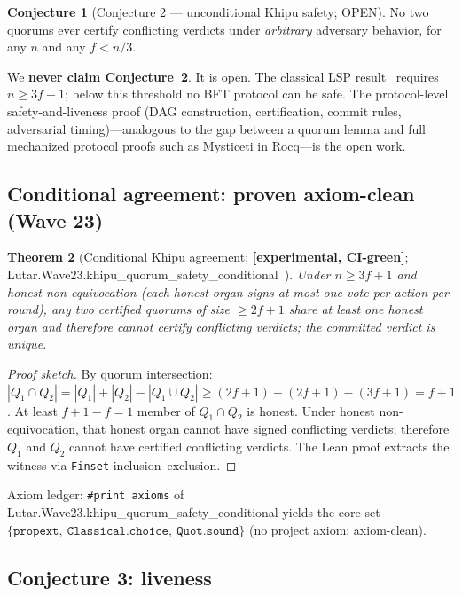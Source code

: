 \documentclass[11pt,letterpaper]{article}
\newcommand{\lean}[1]{{\small\ttfamily #1}}
\newcommand{\lb}{\discretionary{}{}{}}
\newtheorem{theorem}{Theorem}[section]
\theoremstyle{definition}
\newtheorem{conjecture}[theorem]{Conjecture}
\newcommand{\Ucoreaxioms}%
  {\{\texttt{propext},\allowbreak\ \texttt{Classical.choice},\allowbreak\ \texttt{Quot.sound}\}}
\newcommand{\experimental}{\textbf{[experimental, CI-green]}}
\begin{document}
\begin{conjecture}[Conjecture 2 --- unconditional Khipu safety; OPEN]
\label{conj:khipu}
No two quorums ever certify conflicting verdicts under \emph{arbitrary} adversary
behavior, for any $n$ and any $f < n/3$.
\end{conjecture}

\noindent We \textbf{never claim Conjecture~2}.  It is open.  The classical LSP
result~\cite{lamport1982} requires $n \ge 3f+1$; below this threshold no BFT
protocol can be safe.  The protocol-level safety-and-liveness proof (DAG
construction, certification, commit rules, adversarial timing)---analogous to the
gap between a quorum lemma and full mechanized protocol proofs such as Mysticeti
in Rocq---is the open work.

\subsection{Conditional agreement: proven axiom-clean (Wave 23)}

\begin{theorem}[Conditional Khipu agreement; \experimental{};
  \lean{Lutar.\lb Wave23.\lb khipu\_\lb quorum\_\lb safety\_\lb conditional}~\cite{szl_concept}]
\label{thm:khipu}
Under $n \ge 3f+1$ and \emph{honest non-equivocation} (each honest organ signs
at most one vote per action per round), any two certified quorums of size $\ge
2f+1$ share at least one honest organ and therefore cannot certify conflicting
verdicts; the committed verdict is unique.
\end{theorem}

\begin{proof}[Proof sketch]
By quorum intersection: $|Q_1 \cap Q_2| = |Q_1| + |Q_2| - |Q_1 \cup Q_2| \ge
(2f+1) + (2f+1) - (3f+1) = f+1$.  At least $f+1 - f = 1$ member of $Q_1 \cap
Q_2$ is honest.  Under honest non-equivocation, that honest organ cannot have
signed conflicting verdicts; therefore $Q_1$ and $Q_2$ cannot have certified
conflicting verdicts.  The Lean proof extracts the witness via
\texttt{Finset} inclusion--exclusion.
\end{proof}

\noindent Axiom ledger: \texttt{\#print axioms} of
\lean{Lutar.\lb Wave23.\lb khipu\_\lb quorum\_\lb safety\_\lb conditional}
yields the core set $\Ucoreaxioms$ (no project axiom; axiom-clean).

\subsection{Conjecture 3: liveness}
\end{document}
